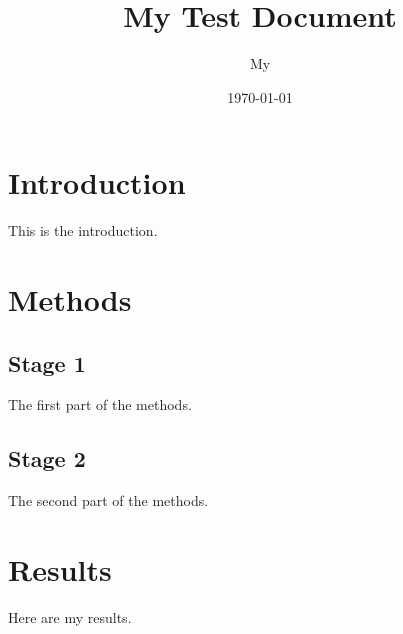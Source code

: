 \documentclass[a4paper,12pt]{report}
\begin{document}
\title{My Test Document}
\author{My }
\date{\today}
\maketitle

\section{Introduction}
This is the introduction.

\section{Methods}

\subsection{Stage 1}
The first part of the methods.

\subsection{Stage 2}
The second part of the methods.

\section{Results}
Here are my results.
\end{document}
